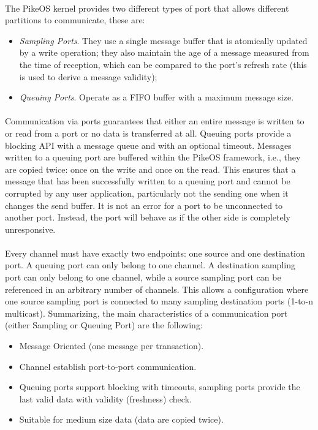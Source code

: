 \paragraph{} The PikeOS  kernel provides two different types of port that allows different partitions to communicate, these are:
\begin{itemize}
\item \emph{Sampling Ports}. They use a single message buffer that is atomically updated by a write operation; they also maintain the age of a message measured from the time of reception, which can be compared to the port’s refresh rate (this is used to derive a message validity);
\item \emph{Queuing Ports}. Operate as a FIFO buffer with a maximum message size.
\end{itemize}

\paragraph{}Communication via ports guarantees that either an entire message is written to or read from a port or no data is transferred at all. Queuing ports provide a blocking API with a message queue and with an optional timeout. Messages written to a queuing port are buffered within the PikeOS framework, i.e., they are copied twice: once on the write and once on the read. This ensures that a message that has been successfully written to a queuing port and cannot be corrupted by any user application, particularly not the sending one when it changes the send buffer. It is not an error for a port to be unconnected to another port. Instead, the port will behave as if the other side is completely unresponsive.

\paragraph{} Every channel must have exactly two endpoints: one source and one destination port. A queuing port can only belong to one channel. A destination sampling port can only belong to one channel, while a source sampling port can be referenced in an arbitrary number of channels. This allows a configuration where one source sampling port is connected to many sampling destination ports (1-to-n multicast). Summarizing, the main characteristics of a communication port (either Sampling or Queuing Port) are the following:
\begin{itemize}
\item Message Oriented (one message per transaction).
\item Channel establish port-to-port communication.
\item Queuing ports support blocking with timeouts, sampling ports provide the last valid data with validity (freshness) check.
\item Suitable for medium size data (data are copied twice).
\end{itemize}

